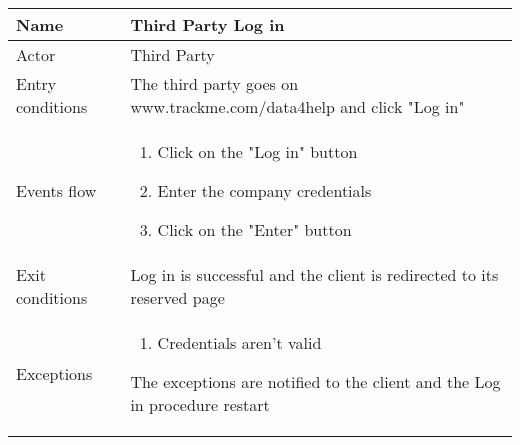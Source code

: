 \begin{table}[]
\begin{tabular}{|l|p{12cm}|}
\hline
Name             & Third Party Log in \\ \hline
Actor            & Third Party \\ \hline
Entry conditions & The third party goes on www.trackme.com/data4help and click "Log in" \\ \hline
Events flow      & \begin{enumerate}
\item Click on the "Log in" button
\item Enter the company credentials
\item Click on the "Enter" button
\end{enumerate} \\ \hline
Exit conditions  & Log in is successful and the client is redirected to its reserved page  \\ \hline
Exceptions       & \begin{enumerate}
\item Credentials aren't valid
\end{enumerate} The exceptions are notified to the client and the Log in procedure restart  \\ \hline
\end{tabular}
\end{table}


